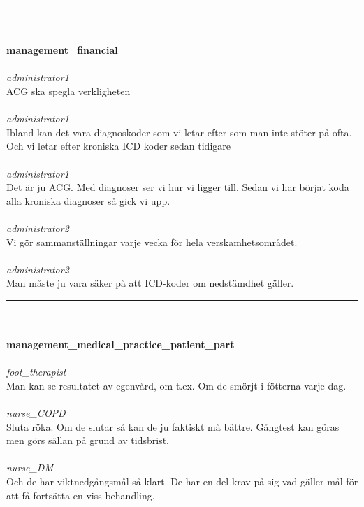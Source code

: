 \documentclass[12pt,a4paper,oneside]{article}
\begin{document}
\hrule
\ \\\ \\{\bf management\_financial }
\\\ \\%
 { \it administrator1 %
}\\
ACG ska spegla verkligheten %
\ \\\ \\
 { \it   administrator1 %
}\\
Ibland kan det vara diagnoskoder som vi letar efter som man inte st{\"o}ter p{\aa} ofta. Och vi letar efter kroniska ICD koder sedan tidigare %
\ \\\ \\
 { \it   administrator1 %
}\\
Det {\"a}r ju ACG. Med diagnoser ser vi hur vi ligger till. Sedan vi har b{\"o}rjat  koda alla kroniska diagnoser s{\aa} gick vi upp.  %
\ \\\ \\
 { \it   administrator2 %
}\\
Vi g{\"o}r sammanst{\"a}llningar varje vecka f{\"o}r hela verskamhetsomr{\aa}det. %
\ \\\ \\
 { \it   administrator2 %
}\\
Man m{\aa}ste ju vara s{\"a}ker p{\aa} att ICD-koder om nedst{\"a}mdhet g{\"a}ller.  %


\hrule
\ \\\ \\{\bf management\_medical\_practice\_patient\_part }
\\\ \\%
 { \it foot\_therapist %
}\\
Man kan se  resultatet av egenv{\aa}rd,  om t.ex. Om de sm{\"o}rjt i f{\"o}tterna varje dag. %
\ \\\ \\
 { \it   nurse\_COPD %
}\\
Sluta r{\"o}ka. Om de slutar s{\aa} kan de ju faktiskt m{\aa} b{\"a}ttre. G{\aa}ngtest kan g{\"o}ras men g{\"o}rs s{\"a}llan p{\aa} grund av tidsbrist. %
\ \\\ \\
 { \it   nurse\_DM %
}\\
Och de har viktnedg{\aa}ngsm{\aa}l s{\aa} klart. De har en del krav p{\aa} sig vad g{\"a}ller m{\aa}l f{\"o}r att f{\aa} forts{\"a}tta en viss behandling. %
\end{document}
